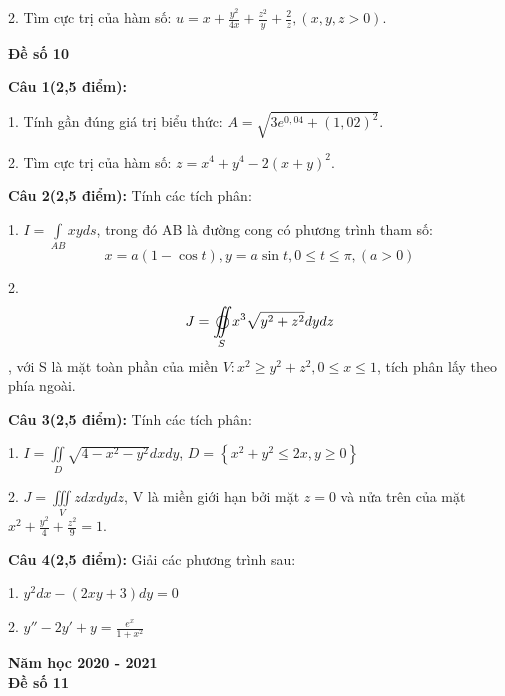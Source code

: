 \documentclass[14pt, a4paper]{article}
\begin{document}
	2. Tìm cực trị của hàm số: $ u = x + \frac{{{y^2}}}{{4x}} + \frac{{{z^2}}}{y} + \frac{2}{z},(x,y,z > 0) $.
	
	\pagebreak
	
	\begin{center}
		{\large \textbf{Đề số 10}}
	\end{center}
	
	\textbf{Câu 1(2,5 điểm):}
	
	1. Tính gần đúng giá trị biểu thức: $ A = \sqrt {3{e^{0,04}} + {{(1,02)}^2}}  $.
	
	2. Tìm cực trị của hàm số: $ z = {x^4} + {y^4} - 2{(x + y)^2} $.
	
	\vspace{0.5cm}
	
	\textbf{Câu 2(2,5 điểm):} Tính các tích phân:
	
	1. $ I = \int\limits_{AB} {xyds}  $, trong đó AB là đường cong có phương trình tham số: \[x = a(1 - \cos t),y = a\sin t,0 \leqslant t \leqslant \pi ,(a > 0)\]
	
	2. \[J = \mathop{{\int\!\!\!\!\!\int}\mkern-21mu \bigcirc}\limits_S 
	{{x^3}\sqrt {{y^2} + {z^2}} dydz} \], với S là mặt toàn phần của miền $  V:{x^2} \geqslant {y^2} + {z^2},0 \leqslant x \leqslant 1 $, tích phân lấy theo phía ngoài.
	
	\vspace{0.5cm}
	
	\textbf{Câu 3(2,5 điểm):} Tính các tích phân:
	
	1. $ I = \iint\limits_D {\sqrt {4 - {x^2} - {y^2}} dxdy} $, $ D = \left\{ {{x^2} + {y^2} \leqslant 2x,y \geqslant 0} \right\} $
	
	2. $ J = \iiint\limits_V {zdxdydz} $, V là miền giới hạn bởi mặt $ z=0 $ và nửa trên của mặt $ {x^2} + \frac{{{y^2}}}{4} + \frac{{{z^2}}}{9} = 1 $.
	
	\vspace{0.5cm}
	
	\textbf{Câu 4(2,5 điểm):} Giải các phương trình sau:
	
	1. $ {y^2}dx - (2xy + 3)dy = 0 $
	
	2. $ y'' - 2y' + y = \frac{{{e^x}}}{{1 + {x^2}}} $
	
	\pagebreak
	
	\begin{center}
		{\LARGE \textbf{Năm học 2020 - 2021}}\\
		\vspace{0.5cm}
		{\large \textbf{Đề số 11}}
	\end{center}
	
\end{document}
